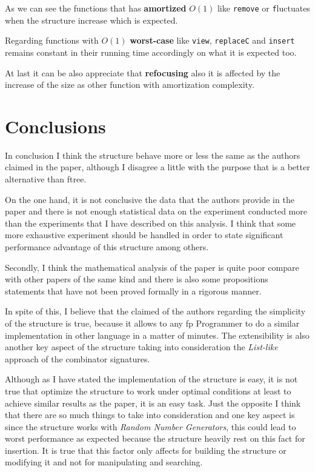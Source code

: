 \documentclass[12pt, a4paper]{article}
\begin{document}
As we can see the functions that has \textbf{amortized} $O(1)$ like \texttt{remove} or \texttt fluctuates when the structure increase which is expected.

Regarding functions with $O(1)$ \textbf{worst-case} like \texttt{view}, \texttt{replaceC} and \texttt{insert} remains constant in their running time accordingly on what it is expected too.

At last it can be also appreciate that \textbf{refocusing} also it is affected by the increase of the size as other function with amortization complexity.

\section{Conclusions}
In conclusion I think the structure behave more or less the same as the authors claimed in the paper, although I disagree a little with the purpose that is a better alternative than \acrshort{ftree}.

On the one hand, it is not conclusive the data that the authors provide in the paper and there is not enough statistical data on the experiment conducted more than the experiments that I have described on this analysis. I think that some more exhaustive experiment should be handled in order to state significant performance advantage of this structure among others.

Secondly, I think the mathematical analysis of the paper is quite poor compare with other papers of the same kind and there is also some propositions statements that have not been proved formally in a rigorous manner.

In spite of this, I believe that the claimed of the authors regarding the simplicity of the structure is true, because it allows to any \acrshort{fp} Programmer to do a similar implementation in other language in a matter of minutes. The extensibility is also another key aspect of the structure taking into consideration the \textit{List-like} approach of the combinator signatures.

Although as I have stated the implementation of the structure is easy, it is not true that optimize the structure to work under optimal conditions at least to achieve similar results as the paper, it is an easy task. Just the opposite I think that there are so much things to take into consideration and one key aspect is since the structure works with  \textit{Random Number Generators}, this could lead to worst performance as expected because the structure heavily rest on this fact for insertion. It is true that this factor only affects for building the structure or modifying it and not for manipulating and searching.
\end{document}
